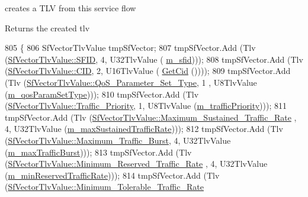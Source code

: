 creates a T\+LV from this service flow 

\begin{DoxyReturn}{Returns}
the created tlv 
\end{DoxyReturn}

\begin{DoxyCode}
805 \{
806   SfVectorTlvValue tmpSfVector;
807   tmpSfVector.Add (Tlv (\hyperlink{classns3_1_1SfVectorTlvValue_aa23ab5c7acfce609dbfe28024c6d2ef7a3a1c1c00258b4efc6901ef23b75eef56}{SfVectorTlvValue::SFID}, 4, U32TlvValue (
      \hyperlink{classns3_1_1ServiceFlow_ae39adff3ec14a28fc308208e56de4f82}{m\_sfid})));
808   tmpSfVector.Add (Tlv (\hyperlink{classns3_1_1SfVectorTlvValue_aa23ab5c7acfce609dbfe28024c6d2ef7a1627638d4b6c39280f4e94afe1faea61}{SfVectorTlvValue::CID}, 2, U16TlvValue (
      \hyperlink{classns3_1_1ServiceFlow_aa1fd9d5f4f21db6a3ec1aac8c3e6958d}{GetCid} ())));
809   tmpSfVector.Add (Tlv (\hyperlink{classns3_1_1SfVectorTlvValue_aa23ab5c7acfce609dbfe28024c6d2ef7a693fa7df3607cf9155c9abf5cc6a7b44}{SfVectorTlvValue::QoS\_Parameter\_Set\_Type}, 1
      , U8TlvValue (\hyperlink{classns3_1_1ServiceFlow_a76222bd599cc4e27578bafba5304d158}{m\_qosParamSetType})));
810   tmpSfVector.Add (Tlv (\hyperlink{classns3_1_1SfVectorTlvValue_aa23ab5c7acfce609dbfe28024c6d2ef7a6b1fd6e9e6137e7f5cc0ce1b37d83c31}{SfVectorTlvValue::Traffic\_Priority}, 1, U8TlvValue
       (\hyperlink{classns3_1_1ServiceFlow_a536ed647361dd0cc432aec5b4a6d661a}{m\_trafficPriority})));
811   tmpSfVector.Add (Tlv (\hyperlink{classns3_1_1SfVectorTlvValue_aa23ab5c7acfce609dbfe28024c6d2ef7a125581295735fe211fb06da69d9f8284}{SfVectorTlvValue::Maximum\_Sustained\_Traffic\_Rate}
      , 4, U32TlvValue (\hyperlink{classns3_1_1ServiceFlow_a604d5dcda6dbb58528799cf439584ecb}{m\_maxSustainedTrafficRate})));
812   tmpSfVector.Add (Tlv (\hyperlink{classns3_1_1SfVectorTlvValue_aa23ab5c7acfce609dbfe28024c6d2ef7a78828bb106e51ec31cd7e4f425aae174}{SfVectorTlvValue::Maximum\_Traffic\_Burst}, 4, 
      U32TlvValue (\hyperlink{classns3_1_1ServiceFlow_a6d99ed08420605f4f56188eced87ccd0}{m\_maxTrafficBurst})));
813   tmpSfVector.Add (Tlv (\hyperlink{classns3_1_1SfVectorTlvValue_aa23ab5c7acfce609dbfe28024c6d2ef7aa60ff8e299d3229b5a9146a4a679d7f0}{SfVectorTlvValue::Minimum\_Reserved\_Traffic\_Rate}
      , 4, U32TlvValue (\hyperlink{classns3_1_1ServiceFlow_a54dc771349ed7d93631e4a44299838d7}{m\_minReservedTrafficRate})));
814   tmpSfVector.Add (Tlv (\hyperlink{classns3_1_1SfVectorTlvValue_aa23ab5c7acfce609dbfe28024c6d2ef7ac2e29e96a1d01a1eaca1f4ea28919b62}{SfVectorTlvValue::Minimum\_Tolerable\_Traffic\_Rate}

\end{DoxyCode}
